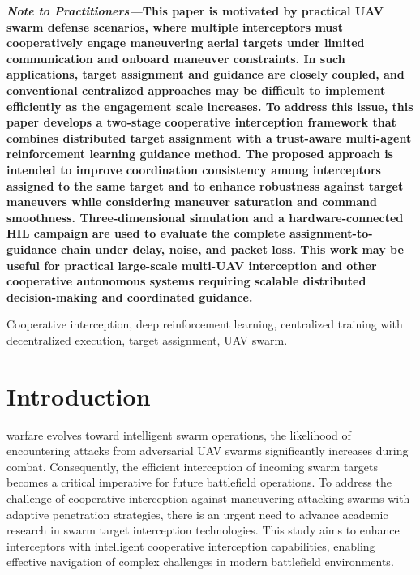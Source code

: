 \documentclass[lettersize,journal]{IEEEtran}
\begin{document}
{\linespread{0.9}\selectfont
\hspace*{0.0em}\textbf{\textit{Note to Practitioners—}}\textbf{This paper is motivated by practical UAV swarm defense scenarios, where multiple interceptors must cooperatively engage maneuvering aerial targets under limited communication and onboard maneuver constraints. In such applications, target assignment and guidance are closely coupled, and conventional centralized approaches may be difficult to implement efficiently as the engagement scale increases. To address this issue, this paper develops a two-stage cooperative interception framework that combines distributed target assignment with a trust-aware multi-agent reinforcement learning guidance method. The proposed approach is intended to improve coordination consistency among interceptors assigned to the same target and to enhance robustness against target maneuvers while considering maneuver saturation and command smoothness. Three-dimensional simulation and a hardware-connected HIL campaign are used to evaluate the complete assignment-to-guidance chain under delay, noise, and packet loss. This work may be useful for practical large-scale multi-UAV interception and other cooperative autonomous systems requiring scalable distributed decision-making and coordinated guidance.}\par\vspace{0.5\baselineskip}
}

\begin{IEEEkeywords}
Cooperative interception, deep reinforcement learning, centralized training with decentralized
execution, target assignment, UAV swarm.
\end{IEEEkeywords}


\section{Introduction}
\label{sec:introduction}
 warfare evolves toward intelligent swarm operations, the likelihood of
encountering attacks from adversarial UAV swarms significantly increases during combat.
Consequently, the efficient interception of incoming swarm targets becomes a critical
imperative for future battlefield operations.
To address the challenge of cooperative interception against maneuvering attacking swarms with
adaptive penetration strategies, there is an urgent need to advance academic research in swarm
target interception technologies.
This study aims to enhance interceptors with intelligent cooperative interception capabilities,
enabling effective navigation of complex challenges in modern battlefield environments.
\end{document}
